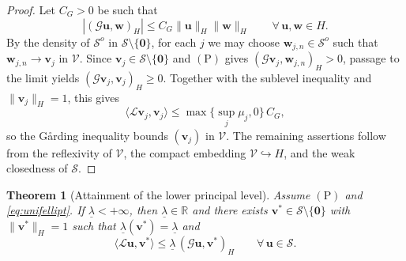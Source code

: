 \documentclass[10pt,a4paper]{amsart}
\newtheorem{theorem}{Theorem}
\begin{document}
\begin{proof}
	Let $C_G>0$ be such that
	\[
	|(\mathcal G\mathbf u,\mathbf w)_H|
	\le C_G\|\mathbf u\|_H\|\mathbf w\|_H
	\qquad \forall\,\mathbf u,\mathbf w\in H.
	\]
	By the density of $\mathcal{S}^o$ in $\mathcal{S}\setminus\{\mathbf{0}\}$,
	for each $j$ we may choose $\mathbf w_{j,n}\in\mathcal S^o$ such that
	$\mathbf w_{j,n}\to\mathbf v_j$ in $\mathcal V$. Since
	$\mathbf v_j\in\mathcal S\setminus\{\mathbf0\}$ and $\mathrm{(P)}$ gives
	$(\mathcal G\mathbf v_j,\mathbf w_{j,n})_H>0$, passage to the limit yields
	$(\mathcal G\mathbf v_j,\mathbf v_j)_H\ge0$. Together with the sublevel
	inequality and $\|\mathbf{v}_j\|_H=1$, this gives
	\[
	\langle\mathcal{L}\mathbf{v}_j,\mathbf{v}_j\rangle
	\le \max\bigl\{\sup_j\mu_j,0\bigr\}\,C_G,
	\]
	so the G{\aa}rding inequality bounds $(\mathbf{v}_j)$ in $\mathcal{V}$.
	The remaining assertions follow from the reflexivity of $\mathcal{V}$, the
	compact embedding $\mathcal{V}\hookrightarrow H$, and the weak closedness of
	$\mathcal{S}$.
\end{proof}

\begin{theorem}[Attainment of the lower principal level]
	\label{thm:general-left-attainment}
	Assume $\mathrm{(P)}$ and \eqref{eq:unifellipt}. If $\underline\lambda<+\infty$,
	then $\underline\lambda\in\mathbb{R}$ and there exists
	$\mathbf{v}^*\in\mathcal{S}\setminus\{\mathbf{0}\}$ with $\|\mathbf{v}^*\|_H=1$
	such that $\underline\lambda(\mathbf{v}^*)=\underline\lambda$ and
	\begin{equation}\label{eq:continuous-left-quasi}
		\langle\mathcal{L}\mathbf{u},\mathbf{v}^*\rangle
		\le \underline\lambda\,(\mathcal{G}\mathbf{u},\mathbf{v}^*)_H
		\qquad \forall\,\mathbf{u}\in\mathcal{S}.
	\end{equation}
\end{theorem}
\end{document}
